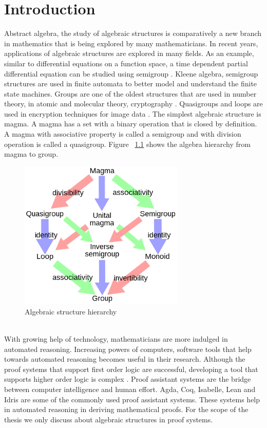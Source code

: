 \chapter{Introduction}
Abstract algebra, the study of algebraic structures is comparatively a new branch in mathematics that is being explored by many mathematicians. In recent years, applications of algebraic structures are explored in many fields. As an example, similar to differential equations on a function space, a time dependent partial differential equation can be studied using semigroup \cite{liaqat2021some}. Kleene algebra, semigroup structures are used in finite automata to better model and understand the finite state machines. Groups are one of the oldest structures that are used in number theory, in atomic and molecular theory, cryptography \cite{enwiki:1133598242}. Quasigroups and loops are used in encryption techniques for image data \cite{didurik2018some}. The simplest algebraic structure is magma. A magma has a set with a binary operation that is closed by definition. A magma with associative property is called a semigroup and with division operation is called a quasigroup. Figure ~\ref{fig_magma} shows the algebra hierarchy from magma to group. 
 \begin{figure}[ht]
	\centering
	\includegraphics[width=0.7\textwidth]{figures/Sample/Magma_to_group.jpg}
	\caption{Algebraic structure hierarchy \cite{enwiki:1107380309}}
	\label{fig_magma}
\end{figure}
\\

With growing help of technology, mathematicians are more indulged in automated reasoning. Increasing powers of computers, software tools that help towards automated reasoning becomes useful in their research. Although the proof systems that support first order logic are successful, developing a tool that supports higher order logic is complex \cite{phillips2010automated}. Proof assistant systems are the bridge between computer intelligence and human effort. Agda, Coq, Isabelle, Lean and Idris are some of the commonly used proof assistant systems. These systems help in automated reasoning in deriving mathematical proofs. For the scope of the thesis we only discuss about algebraic structures in proof systems.

